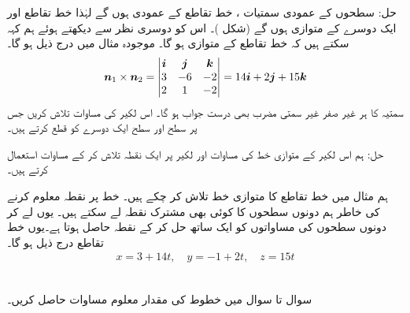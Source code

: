 حل:\quad
سطحوں کے عمودی سمتیات ،      خط تقاطع کے  عمودی ہوں  گے  لہٰذا خط تقاطع اور   ایک دوسرے کے  متوازی ہوں  گے (شکل )۔ اس کو دوسری نظر سے دیکھتے ہوئے ہم کہہ سکتے ہیں کہ   خط تقاطع کے متوازی ہو گا۔ موجودہ مثال میں درج ذیل ہو گا۔
\begin{align*}
{\ensuremath{{\boldsymbol{n}}}}_1\times{\ensuremath{{\boldsymbol{n}}}}_2=\begin{vmatrix}{\boldsymbol{i}}&{\boldsymbol{j}}&{\boldsymbol{k}}\\3&-6&-2\\2&1&-2\end{vmatrix}=14{\boldsymbol{i}}+2{\boldsymbol{j}}+15{\boldsymbol{k}}
\end{align*}
سمتیہ  کا ہر غیر صفر غیر سمتی مضرب بھی درست جواب ہو گا۔
اس لکیر کی مساوات تلاش کریں جس پر سطح  اور سطح  ایک دوسرے کو قطع کرتے ہیں۔

حل:\quad
ہم اس لکیر کے متوازی خط کی مساوات اور  لکیر پر ایک نقطہ  تلاش کر کے   مساوات  استعمال کرتے ہیں۔

ہم مثال  میں  خط  تقاطع کا متوازی خط   تلاش کر چکے ہیں۔ خط پر نقطہ معلوم کرنے کی خاطر  ہم دونوں سطحوں کا  کوئی بھی مشترک نقطہ لے سکتے ہیں۔ یوں  لے کر دونوں سطحوں کی مساواتوں کو ایک ساتھ حل کر کے نقطہ  حاصل ہوتا ہے۔یوں خط تقاطع درج ذیل ہو گا۔
\begin{align*}
x=3+14t,\quad y=-1+2t,\quad z=15t
\end{align*}


\\
سوال  تا  سوال    میں خطوط کی مقدار معلوم مساوات حاصل کریں۔

